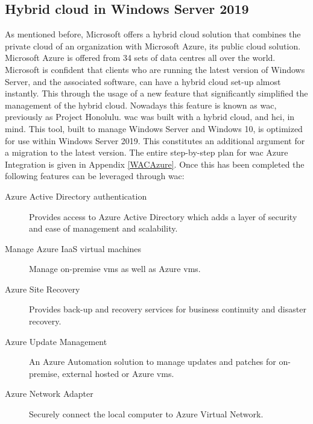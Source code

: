 \subsection{Hybrid cloud in Windows Server 2019}
\label{hybrid-cloud-windows-server-2019}
As mentioned before, Microsoft offers a hybrid cloud solution that combines the private cloud of an organization with Microsoft Azure, its public cloud solution. Microsoft Azure is offered from 34 sets of data centres all over the world. Microsoft is confident that clients who are running the latest version of Windows Server, and the associated software, can have a hybrid cloud set-up almost instantly. This through the usage of a new feature that significantly simplified the management of the hybrid cloud. Nowadays this feature is known as \acrfull{wac}, previously as Project Honolulu. \acrlong{wac} was built with a hybrid cloud, and \acrshort{hci}, in mind. This tool, built to manage Windows Server and Windows 10, is optimized for use within Windows Server 2019. This constitutes an additional argument for a migration to the latest version. The entire step-by-step plan for \acrlong{wac} Azure Integration is given in Appendix \ref{WACAzure}. Once this has been completed the following features \autocite{Washburn2018} can be leveraged through \acrlong{wac}:
\begin{description}
\item [Azure Active Directory authentication] Provides access to Azure Active Directory which adds a layer of security and ease of management and scalability.
\item [Manage Azure IaaS virtual machines] Manage on-premise \acrshort{vm}s as well as Azure \acrshort{vm}s.
\item [Azure Site Recovery] Provides back-up and recovery services for business continuity and disaster recovery.
\item [Azure Update Management] An Azure Automation solution to manage updates and patches for on-premise, external hosted or Azure \acrshort{vm}s.
\item [Azure Network Adapter] Securely connect the local computer to Azure Virtual Network.
\end{description}

\clearpage


